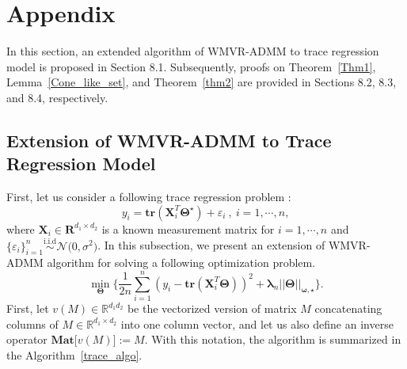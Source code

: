 \documentclass[alpha-refs]{wiley-article}
\begin{document}


\newpage
\section{Appendix}
In this section, an extended algorithm of WMVR-ADMM to trace regression model is proposed in Section 8.1.
Subsequently, proofs on Theorem~\ref{Thm1}, Lemma~\ref{Cone_like_set}, and Theorem~\ref{thm2} are provided in Sections 8.2, 8.3, and 8.4, respectively.

\subsection{Extension of WMVR-ADMM to Trace Regression Model} \label{tr_algo}
First, let us consider a following trace regression problem :
\begin{equation*}
    y_{i} = \textbf{tr}(\boldsymbol{X}^{T}_{i}\boldsymbol{\Theta^\star}) + \varepsilon_{i} \ ,\ i = 1, \cdots, n, \label{eq: TR}
\end{equation*}
where $\boldsymbol{X}_{i} \in \boldsymbol{R}^{d_{1} \times d_{2}}$ is a known measurement matrix for $i = 1, \cdots, n$ and $\big\{\varepsilon_{i}\big\}_{i=1}^{n}\stackrel{\text{i.i.d}}{\sim} \mathcal{N}\big( 0, \sigma^{2} \big)$. 
In this subsection, we present an extension of WMVR-ADMM algorithm for solving a following optimization problem.
\begin{equation*}
    \min_{\boldsymbol{\Theta}} \Bigg\{ \frac{1}{2n}\sum^{n}_{i=1} (y_{i} - \textbf{tr}(\boldsymbol{X}^{T}_{i}\boldsymbol{\Theta}))^2 + \boldsymbol{\lambda}_{n} ||\boldsymbol{\Theta}||_{\boldsymbol{\omega,\star}} \Bigg\}. \label{eq: opt}
\end{equation*}
First, let $v(M)\in\mathbb{R}^{d_{1}d_{2}}$ be the vectorized version of matrix $M$ concatenating columns of $M\in\mathbb{R}^{d_{1} \times d_{2}}$ into one column vector, and let us also define an inverse operator $\textbf{Mat} \big[ v(M) \big] := M$.
With this notation, the algorithm is summarized in the Algorithm~\ref{trace_algo}.
\end{document}

